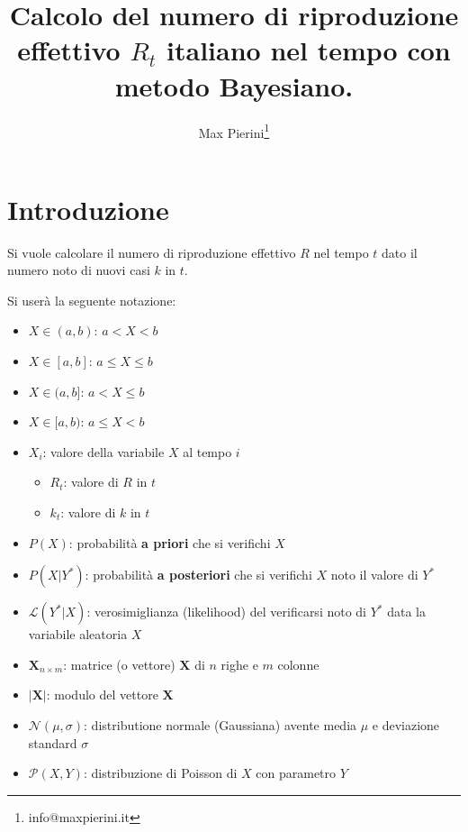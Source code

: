\documentclass[11pt]{article}
\title{Calcolo del numero di riproduzione effettivo $R_t$ italiano nel tempo con metodo Bayesiano.}
\author{Max Pierini\thanks{info@maxpierini.it}}
\begin{document}
    
    \maketitle
    
    

    
    \hypertarget{introduzione}{%
\section{Introduzione}\label{introduzione}}

    Si vuole calcolare il numero di riproduzione effettivo \(R\) nel tempo
\(t\) dato il numero noto di nuovi casi \(k\) in \(t\).

Si userà la seguente notazione:

\begin{itemize}
\item
  \(X \in (a, b)\): \(a < X < b\)
\item
  \(X \in [a, b]\): \(a \leq X \leq b\)
\item
  \(X \in (a, b]\): \(a < X \leq b\)
\item
  \(X \in [a, b)\): \(a \leq X < b\)
\item
  \(X_i\): valore della variabile \(X\) al tempo \(i\)

  \begin{itemize}
  \item
    \(R_t\): valore di \(R\) in \(t\)
  \item
    \(k_t\): valore di \(k\) in \(t\)
  \end{itemize}
\item
  \(P(X)\): probabilità \textbf{a priori} che si verifichi \(X\)
\item
  \(P(X|Y^*)\): probabilità \textbf{a posteriori} che si verifichi \(X\)
  noto il valore di \(Y^*\)
\item
  \(\mathscr{L}(Y^*|X)\): verosimiglianza (likelihood) del verificarsi
  noto di \(Y^*\) data la variabile aleatoria \(X\)
\item
  \(\mathbf{X}_{n \times m}\): matrice (o vettore) \(\mathbf{X}\) di
  \(n\) righe e \(m\) colonne
\item
  \(| \mathbf{X} |\): modulo del vettore \(\mathbf{X}\)
\item
  \(\mathscr{N}(\mu,\sigma)\): distributione normale (Gaussiana) avente
  media \(\mu\) e deviazione standard \(\sigma\)
\item
  \(\mathscr{P}(X,Y)\): distribuzione di Poisson di \(X\) con parametro
  \(Y\)
\end{itemize}
\end{document}
